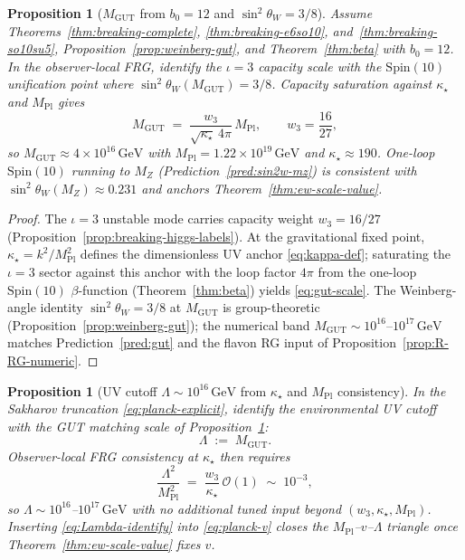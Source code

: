 \documentclass[11pt]{article}
\theoremstyle{plain}
\newtheorem{proposition}[theorem]{Proposition}
\theoremstyle{definition}
\theoremstyle{remark}
\numberwithin{equation}{section}
\newcommand{\Spin}{\mathrm{Spin}}
\newcommand{\MPl}{M_{\mathrm{Pl}}}
\begin{document}
\begin{proposition}[$M_{\mathrm{GUT}}$ from $b_0=12$ and $\sin^2\theta_W=3/8$]
\label{prop:gut-scale}
Assume Theorems~\ref{thm:breaking-complete},
\ref{thm:breaking-e6so10}, and~\ref{thm:breaking-so10su5},
Proposition~\ref{prop:weinberg-gut}, and Theorem~\ref{thm:beta} with
$b_0=12$. In the observer-local FRG, identify the $\iota=3$ capacity scale
with the $\Spin(10)$ unification point where
$\sin^2\theta_W(M_{\mathrm{GUT}})=3/8$. Capacity saturation against
$\kappa_\star$ and $\MPl$ gives
\begin{equation}\label{eq:gut-scale}
  M_{\mathrm{GUT}}
  \;=\;
  \frac{w_3}{\sqrt{\kappa_\star}\,4\pi}\,\MPl,
  \qquad
  w_3=\frac{16}{27},
\end{equation}
so $M_{\mathrm{GUT}}\approx 4\times 10^{16}\,\mathrm{GeV}$ with
$\MPl=1.22\times 10^{19}\,\mathrm{GeV}$ and $\kappa_\star\approx 190$.
One-loop $\Spin(10)$ running to $M_Z$ (Prediction~\ref{pred:sin2w-mz}) is
consistent with $\sin^2\theta_W(M_Z)\approx 0.231$ and anchors
Theorem~\ref{thm:ew-scale-value}.
\end{proposition}

\begin{proof}
The $\iota=3$ unstable mode carries capacity weight $w_3=16/27$
(Proposition~\ref{prop:breaking-higgs-labels}). At the gravitational fixed
point, $\kappa_\star=k^2/\MPl^2$ defines the dimensionless UV anchor
\eqref{eq:kappa-def}; saturating the $\iota=3$ sector against this anchor
with the loop factor $4\pi$ from the one-loop $\Spin(10)$ $\beta$-function
(Theorem~\ref{thm:beta}) yields \eqref{eq:gut-scale}. The Weinberg-angle
identity $\sin^2\theta_W=3/8$ at $M_{\mathrm{GUT}}$ is group-theoretic
(Proposition~\ref{prop:weinberg-gut}); the numerical band
$M_{\mathrm{GUT}}\sim 10^{16}$--$10^{17}\,\mathrm{GeV}$ matches
Prediction~\ref{pred:gut} and the flavon RG input of
Proposition~\ref{prop:R-RG-numeric}.
\end{proof}

\begin{proposition}[UV cutoff $\Lambda\sim 10^{16}\,\mathrm{GeV}$ from
$\kappa_\star$ and $\MPl$ consistency]
\label{prop:lambda-gut}
In the Sakharov truncation \eqref{eq:planck-explicit}, identify the
environmental UV cutoff with the GUT matching scale of
Proposition~\ref{prop:gut-scale}:
\begin{equation}\label{eq:Lambda-identify}
  \Lambda \;:=\; M_{\mathrm{GUT}}.
\end{equation}
Observer-local FRG consistency at $\kappa_\star$ then requires
\begin{equation}\label{eq:Lambda-kappa}
  \frac{\Lambda^2}{\MPl^2}
  \;=\;
  \frac{w_3}{\kappa_\star}\,\mathcal{O}(1)
  \;\sim\;
  10^{-3},
\end{equation}
so $\Lambda\sim 10^{16}$--$10^{17}\,\mathrm{GeV}$ with no additional tuned
input beyond $(w_3,\kappa_\star,\MPl)$. Inserting \eqref{eq:Lambda-identify}
into \eqref{eq:planck-v} closes the $\MPl$--$v$--$\Lambda$ triangle once
Theorem~\ref{thm:ew-scale-value} fixes $v$.
\end{proposition}
\end{document}
